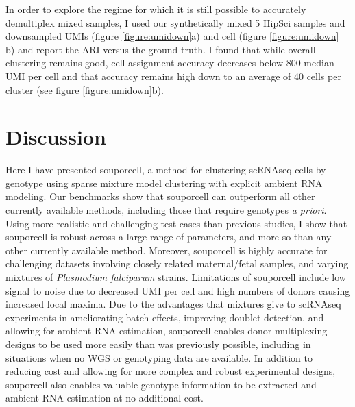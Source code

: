 \par{
In order to explore the regime for which it is still possible to accurately demultiplex mixed samples, I
used our synthetically mixed 5 HipSci samples and downsampled UMIs (figure \ref{figure:umidown}a) and cell (figure \ref{figure:umidown}
b) and report the ARI versus the ground truth. I found that while overall clustering remains good, cell
assignment accuracy decreases below 800 median UMI per cell and that accuracy remains high down to
an average of 40 cells per cluster (see figure \ref{figure:umidown}b). 
}






\section{Discussion}
\par{
Here I have presented souporcell, a method for clustering scRNAseq cells by genotype using sparse mixture model clustering with explicit ambient RNA modeling. Our benchmarks show that souporcell can outperform all other currently available methods, including those that require genotypes \textit{a priori}. Using more realistic and challenging test cases than previous studies, I show that souporcell is robust across a large range of parameters, and more so than any other currently available method. Moreover, souporcell is highly accurate for challenging datasets involving closely related maternal/fetal samples, and varying mixtures of \textit{Plasmodium falciparum} strains. Limitations of souporcell include low signal to noise due to decreased UMI per cell and high numbers of donors causing increased local maxima. Due to the advantages that mixtures give to scRNAseq experiments in ameliorating batch effects, improving doublet detection, and allowing for ambient RNA estimation, souporcell enables donor multiplexing designs to be used more easily than was previously possible, including in situations when no WGS or genotyping data are available. In addition to reducing cost and allowing for more complex and robust experimental designs, souporcell also enables valuable genotype information to be extracted and ambient RNA estimation at no additional cost.
}


